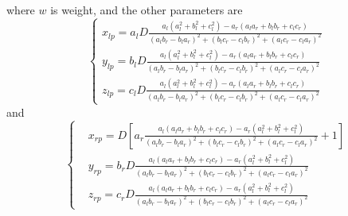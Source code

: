 \documentclass[journal,article,submit,moreauthors,pdftex,10pt,a4paper]{mdpi}
\begin{document}
where $w$ is weight, and the other parameters are
\small
\begin{equation}
\left\{ 
\begin{aligned}
x_{lp}=a_lD \frac{ a_l (a_l^2 + b_l^2 + c_l^2) - a_r (a_la_r + b_lb_r + c_lc_r)}{ (a_lb_r-b_la_r)^2 + (b_lc_r-c_lb_r)^2 + (a_lc_r-c_la_r)^2} \\
y_{lp}=b_lD \frac{ a_l (a_l^2 + b_l^2 + c_l^2) - a_r (a_la_r + b_lb_r + c_lc_r)}{ (a_lb_r-b_la_r)^2 + (b_lc_r-c_lb_r)^2 + (a_lc_r-c_la_r)^2} \\
z_{lp}=c_lD \frac{ a_l (a_l^2 + b_l^2 + c_l^2) - a_r (a_la_r + b_lb_r + c_lc_r)}{ (a_lb_r-b_la_r)^2 + (b_lc_r-c_lb_r)^2 + (a_lc_r-c_la_r)^2}
\end{aligned}
\right.
\end{equation}
and 
\begin{equation}
\left\{
\begin{aligned}
&x_{rp}=D \left[ a_r\frac{a_l(a_la_r + b_lb_r + c_lc_r)  - a_r (a_l^2 + b_l^2 + c_l^2)}{ (a_lb_r-b_la_r)^2 + (b_lc_r-c_lb_r)^2 + (a_lc_r-c_la_r)^2}+ 1\right]  \\
&y_{rp}=b_rD\frac{ a_l(a_la_r + b_lb_r + c_lc_r)  - a_r (a_l^2 + b_l^2 + c_l^2)}{ (a_lb_r-b_la_r)^2 + (b_lc_r-c_lb_r)^2 + (a_lc_r-c_la_r)^2} \\
&z_{rp}=c_rD \frac{ a_l(a_la_r + b_lb_r + c_lc_r)  - a_r (a_l^2 + b_l^2 + c_l^2)}{ (a_lb_r-b_la_r)^2 + (b_lc_r-c_lb_r)^2 + (a_lc_r-c_la_r)^2}
\end{aligned}
\right.
\end{equation}
\end{document}
